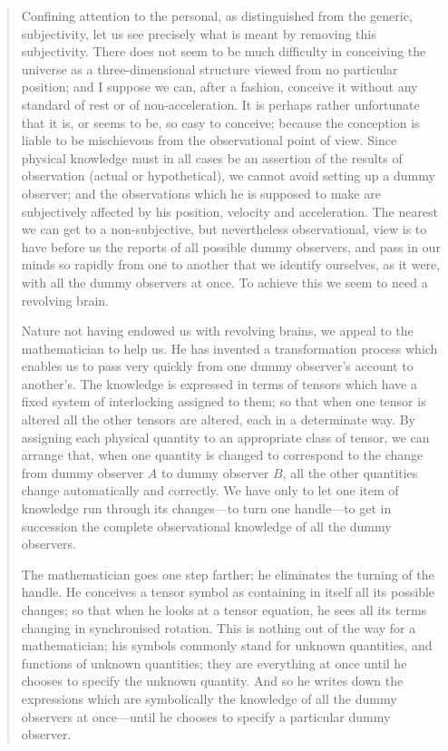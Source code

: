 \begin{quote}
    Confining attention to the personal, as distinguished from the generic, subjectivity, let us see precisely what is meant by removing this subjectivity.  There does not seem to be much difficulty in conceiving the universe as a three-dimensional structure viewed from no particular position; and I suppose we can, after a fashion, conceive it without any standard of rest or of non-acceleration.  It is perhaps rather unfortunate that it is, or seems to be, so easy to conceive; because the conception is liable to be mischievous from the observational point of view.  Since physical knowledge must in all cases be an assertion of the results of observation (actual or hypothetical), we cannot avoid setting up a dummy observer; and the observations which he is supposed to make are subjectively affected by his position, velocity and acceleration.  The nearest we can get to a non-subjective, but nevertheless observational, view is to have before us the reports of all possible dummy observers, and pass in our minds so rapidly from one to another that we identify ourselves, as it were, with all the dummy observers at once.  To achieve this we seem to need a revolving brain.  

    Nature not having endowed us with revolving brains, we appeal to the mathematician to help us.  He has invented a transformation process which enables us to pass very quickly from one dummy observer's account to another's.  The knowledge is expressed in terms of tensors which have a fixed system of interlocking assigned to them; so that when one tensor is altered all the other tensors are altered, each in a determinate way.  By assigning each physical quantity to an appropriate class of tensor, we can arrange that, when one quantity is changed to correspond to the change from dummy observer $A$ to dummy observer $B$, all the other quantities change automatically and correctly.  We have only to let one item of knowledge run through its changes---to turn one handle---to get in succession the complete observational knowledge of all the dummy observers.

    The mathematician goes one step farther; he eliminates the turning of the handle.  He conceives a tensor symbol as containing in itself all its possible changes; so that when he looks at a tensor equation, he sees all its terms changing in synchronised rotation.  This is nothing out of the way for a mathematician; his symbols commonly stand for unknown quantities, and functions of unknown quantities; they are everything at once until he chooses to specify the unknown quantity.  And so he writes down the expressions which are symbolically the knowledge of all the dummy observers at once---until he chooses to specify a particular dummy observer.


\end{quote}
